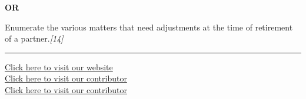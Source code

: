 \documentclass[11pt,a4paper]{article}
\newcommand{\pts}[1]{\hfill   \textit{[#1]}}
\begin{document}
\centerline{   \textbf{OR}}

Enumerate the various matters that need adjustments at the time of retirement of a partner.\pts{14}

\vfill
\rule{\linewidth}{0.4pt}

\begin{center}\small
\href{https://bhu-exam.vercel.app/}{Click here to visit our website}\\[4pt]
\href{https://me-aryan.vercel.app/}{Click here to visit our contributor}\\[4pt]
\href{https://quashan-me.vercel.app/}{Click here to visit our contributor}
\end{center}
\end{document}
